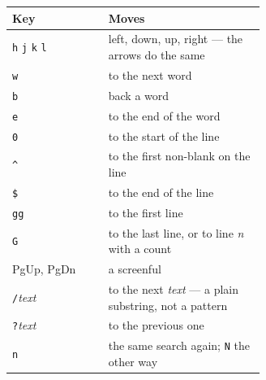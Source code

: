 \begin{center}
\small
\begin{tabular}{@{}l >{\raggedright\arraybackslash}p{0.62\linewidth}@{}}
\toprule
\textbf{Key} & \textbf{Moves} \\
\midrule
\texttt{h} \texttt{j} \texttt{k} \texttt{l} & left, down, up, right --- the arrows do the same \\
\texttt{w} & to the next word \\
\texttt{b} & back a word \\
\texttt{e} & to the end of the word \\
\texttt{0} & to the start of the line \\
\texttt{\textasciicircum} & to the first non-blank on the line \\
\texttt{\$} & to the end of the line \\
\texttt{gg} & to the first line \\
\texttt{G} & to the last line, or to line \emph{n} with a count \\
PgUp, PgDn & a screenful \\
\texttt{/}\emph{text} & to the next \emph{text} --- a plain substring, not a pattern \\
\texttt{?}\emph{text} & to the previous one \\
\texttt{n} & the same search again; \texttt{N} the other way \\
\bottomrule
\end{tabular}
\end{center}

